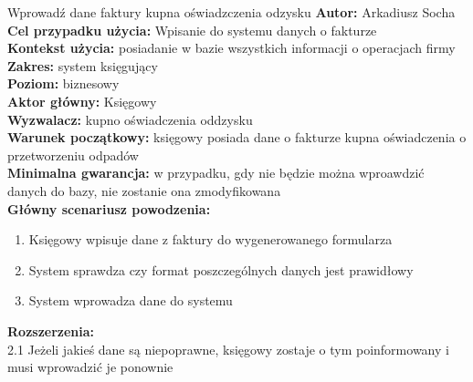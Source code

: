\begin{usecase}{Wprowadź dane faktury kupna oświadzczenia odzysku}
	\textbf{Autor:} Arkadiusz Socha\\
	\textbf{Cel przypadku użycia:} Wpisanie do systemu danych o fakturze \\
	\textbf{Kontekst użycia:} posiadanie w bazie wszystkich informacji o operacjach firmy\\
	\textbf{Zakres:} system księgujący \\
	\textbf{Poziom:} biznesowy \\
	\textbf{Aktor główny:} Księgowy \\
	\textbf{Wyzwalacz:} kupno oświadczenia oddzysku \\
	\textbf{Warunek początkowy:} księgowy posiada dane o fakturze kupna oświadczenia o przetworzeniu odpadów \\
	\textbf{Minimalna gwarancja:} w przypadku, gdy nie będzie można wproawdzić danych do bazy, nie zostanie ona zmodyfikowana \\
	\textbf{Główny scenariusz powodzenia:} 
		\begin{enumerate}
			\item Księgowy wpisuje dane z faktury do wygenerowanego formularza
			\item System sprawdza czy format poszczególnych danych jest prawidłowy
			\item System wprowadza dane do systemu
		\end{enumerate}
	\textbf{Rozszerzenia:} \\
	2.1 Jeżeli jakieś dane są niepoprawne, księgowy zostaje o tym poinformowany i musi wprowadzić je ponownie
\end{usecase}

